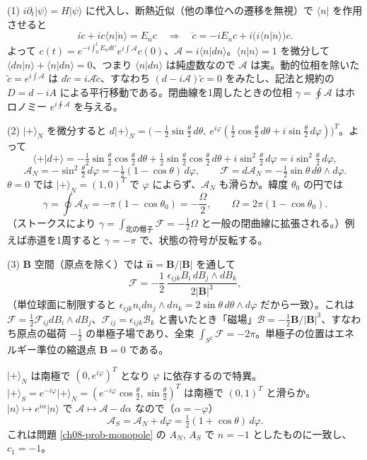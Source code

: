 \begin{solution}
(1) $i\partial_t\lvert\psi\rangle=H\lvert\psi\rangle$ に代入し、断熱近似（他の準位への遷移を無視）で $\langle n|$ を作用させると
\[
i\dot c+i c\langle n|\dot n\rangle=E_nc\quad\Longrightarrow\quad\dot c=-iE_nc+i\bigl(i\langle n|\dot n\rangle\bigr)c .
\]
よって $c(t)=e^{-i\int_0^tE_ndt'}e^{i\int\mathcal A}c(0)$、$\mathcal A=i\langle n|dn\rangle$。$\langle n|n\rangle=1$ を微分して $\langle dn|n\rangle+\langle n|dn\rangle=0$、つまり $\langle n|dn\rangle$ は純虚数なので $\mathcal A$ は実。動的位相を除いた $\tilde c=e^{i\int\mathcal A}$ は $d\tilde c=i\mathcal A\tilde c$、すなわち $(d-i\mathcal A)\tilde c=0$ をみたし、記法と規約の $D=d-iA$ による平行移動である。閉曲線を1周したときの位相 $\gamma=\oint\mathcal A$ はホロノミー $e^{i\oint\mathcal A}$ を与える。

(2) $\lvert+\rangle_N$ を微分すると $d\lvert+\rangle_N=\bigl(-\tfrac12\sin\tfrac\theta2\,d\theta,\ e^{i\varphi}(\tfrac12\cos\tfrac\theta2\,d\theta+i\sin\tfrac\theta2\,d\varphi)\bigr)^T$。よって
\[
\langle+|d+\rangle=-\tfrac12\sin\tfrac\theta2\cos\tfrac\theta2\,d\theta+\tfrac12\sin\tfrac\theta2\cos\tfrac\theta2\,d\theta+i\sin^2\tfrac\theta2\,d\varphi=i\sin^2\tfrac\theta2\,d\varphi,
\]
\[
\mathcal A_N=-\sin^2\tfrac\theta2\,d\varphi=-\tfrac12(1-\cos\theta)\,d\varphi,\qquad\mathcal F=d\mathcal A_N=-\tfrac12\sin\theta\,d\theta\wedge d\varphi .
\]
$\theta=0$ では $\lvert+\rangle_N=(1,0)^T$ で $\varphi$ によらず、$\mathcal A_N$ も滑らか。緯度 $\theta_0$ の円では
\[
\gamma=\oint\mathcal A_N=-\pi(1-\cos\theta_0)=-\frac{\Omega}{2},\qquad\Omega=2\pi(1-\cos\theta_0).
\]
（ストークスにより $\gamma=\int_{\text{北の帽子}}\mathcal F=-\frac12\Omega$ と一般の閉曲線に拡張される。）例えば赤道を1周すると $\gamma=-\pi$ で、状態の符号が反転する。

(3) $\bm B$ 空間（原点を除く）では $\hat{\bm n}=\bm B/\lvert\bm B\rvert$ を通して
\[
\mathcal F=-\frac12\,\frac{\epsilon_{ijk}B_i\,dB_j\wedge dB_k}{2\lvert\bm B\rvert^3},
\]
（単位球面に制限すると $\epsilon_{ijk}n_idn_j\wedge dn_k=2\sin\theta\,d\theta\wedge d\varphi$ だから一致）。これは $\mathcal F=\frac12\mathcal F_{ij}dB_i\wedge dB_j$、$\mathcal F_{ij}=\epsilon_{ijk}\mathcal B_k$ と書いたとき「磁場」$\bm{\mathcal B}=-\frac12\bm B/\lvert\bm B\rvert^3$、すなわち原点の磁荷 $-\frac12$ の単極子場であり、全束 $\int_{S^2}\mathcal F=-2\pi$。単極子の位置はエネルギー準位の縮退点 $\bm B=0$ である。

$\lvert+\rangle_N$ は南極で $(0,e^{i\varphi})^T$ となり $\varphi$ に依存するので特異。$\lvert+\rangle_S=e^{-i\varphi}\lvert+\rangle_N=(e^{-i\varphi}\cos\frac\theta2,\sin\frac\theta2)^T$ は南極で $(0,1)^T$ と滑らか。$\lvert n\rangle\mapsto e^{i\alpha}\lvert n\rangle$ で $\mathcal A\mapsto\mathcal A-d\alpha$ なので（$\alpha=-\varphi$）
\[
\mathcal A_S=\mathcal A_N+d\varphi=\tfrac12(1+\cos\theta)\,d\varphi .
\]
これは問題 \ref{ch08-prob-monopole} の $A_N$, $A_S$ で $n=-1$ としたものに一致し、$c_1=-1$。


\end{solution}
